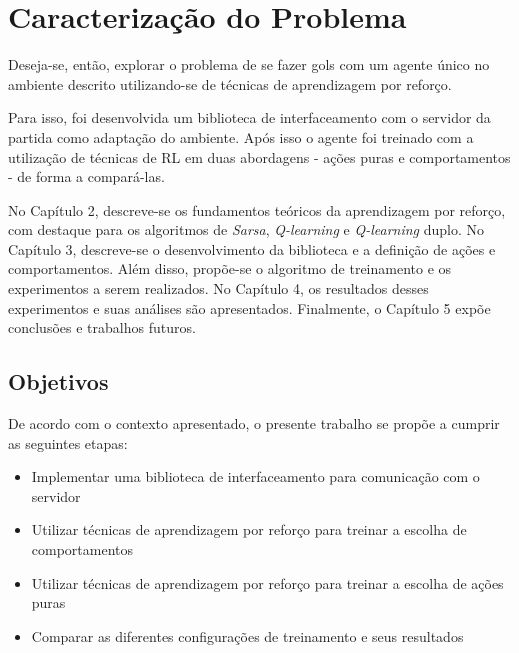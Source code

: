 \section{Caracterização do Problema}
\par Deseja-se, então, explorar o problema de se fazer gols com um agente único no ambiente descrito utilizando-se de técnicas de aprendizagem por reforço.
\par Para isso, foi desenvolvida um biblioteca de interfaceamento com o servidor da partida como adaptação do ambiente. Após isso o agente foi treinado com a utilização de técnicas de RL em duas abordagens - ações puras e comportamentos - de forma a compará-las.
\par No Capítulo 2, descreve-se os fundamentos teóricos da aprendizagem por reforço, com destaque para os algoritmos de \textit{Sarsa}, \textit{Q-learning} e \textit{Q-learning} duplo. No Capítulo 3, descreve-se o desenvolvimento da biblioteca e a definição de ações e comportamentos. Além disso, propõe-se o algoritmo de treinamento e os experimentos a serem realizados. No Capítulo 4, os resultados desses experimentos e suas análises são apresentados. Finalmente, o Capítulo 5 expõe conclusões e trabalhos futuros.

\subsection{Objetivos}
\par De acordo com o contexto apresentado, o presente trabalho se propõe a cumprir as seguintes etapas:
\begin{itemize}
	\item Implementar uma biblioteca de interfaceamento para comunicação com o servidor
	\item Utilizar técnicas de aprendizagem por reforço para treinar a escolha de comportamentos
	\item Utilizar técnicas de aprendizagem por reforço para treinar a escolha de ações puras
	\item Comparar as diferentes configurações de treinamento e seus resultados
\end{itemize}

